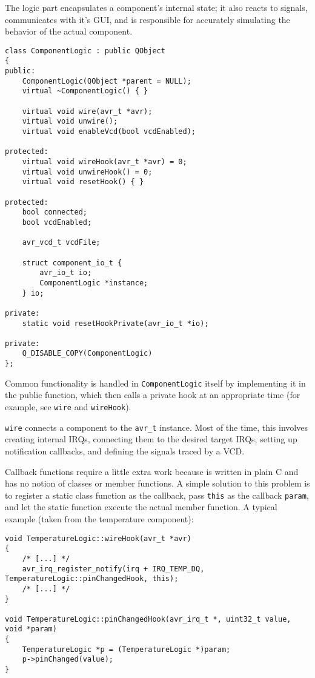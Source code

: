 The logic part encapsulates a component's internal state; it also reacts to signals,
communicates with it's \ac{GUI}, and is responsible for accurately simulating
the behavior of the actual component.

\begin{lstlisting}
class ComponentLogic : public QObject
{
public:
    ComponentLogic(QObject *parent = NULL);
    virtual ~ComponentLogic() { }

    virtual void wire(avr_t *avr);
    virtual void unwire();
    virtual void enableVcd(bool vcdEnabled);

protected:
    virtual void wireHook(avr_t *avr) = 0;
    virtual void unwireHook() = 0;
    virtual void resetHook() { }

protected:
    bool connected;
    bool vcdEnabled;

    avr_vcd_t vcdFile;

    struct component_io_t {
        avr_io_t io;
        ComponentLogic *instance;
    } io;

private:
    static void resetHookPrivate(avr_io_t *io);

private:
    Q_DISABLE_COPY(ComponentLogic)
};
\end{lstlisting}

Common functionality is handled in \lstinline|ComponentLogic| itself by implementing
it in the public function, which then calls a private hook at an appropriate time
(for example, see \lstinline|wire| and \lstinline|wireHook|).

\lstinline|wire| connects a component to the \lstinline|avr_t| instance. Most of
the time, this involves creating internal \acp{IRQ}, connecting them to the
desired target \acp{IRQ}, setting up notification callbacks, and defining the
signals traced by a \ac{VCD}.

Callback functions require a little extra work because \simavr is written in plain
C and has no notion of classes or member functions. A simple solution to this problem
is to register a static class function as the callback, pass \lstinline|this| as
the callback \lstinline|param|, and let the static function execute the actual member
function. A typical example (taken from the temperature component):

\begin{lstlisting}
void TemperatureLogic::wireHook(avr_t *avr)
{
    /* [...] */
    avr_irq_register_notify(irq + IRQ_TEMP_DQ, TemperatureLogic::pinChangedHook, this);
    /* [...] */
}

void TemperatureLogic::pinChangedHook(avr_irq_t *, uint32_t value, void *param)
{
    TemperatureLogic *p = (TemperatureLogic *)param;
    p->pinChanged(value);
}
\end{lstlisting}

